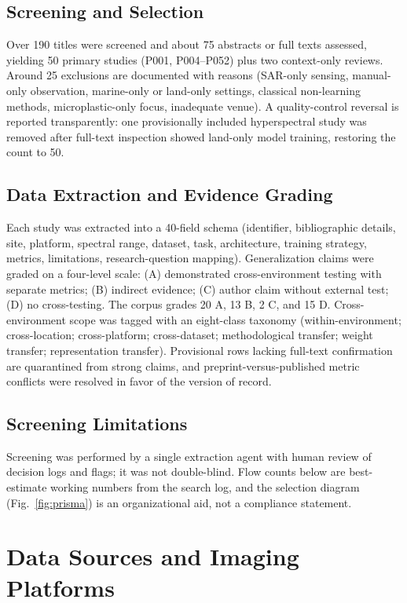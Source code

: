 \documentclass[12pt]{article}
\begin{document}
\subsection{Screening and Selection}
Over 190 titles were screened and about 75 abstracts or full texts assessed, yielding 50 primary studies (P001, P004--P052) plus two context-only reviews. Around 25 exclusions are documented with reasons (SAR-only sensing, manual-only observation, marine-only or land-only settings, classical non-learning methods, microplastic-only focus, inadequate venue). A quality-control reversal is reported transparently: one provisionally included hyperspectral study was removed after full-text inspection showed land-only model training, restoring the count to 50.

\subsection{Data Extraction and Evidence Grading}
Each study was extracted into a 40-field schema (identifier, bibliographic details, site, platform, spectral range, dataset, task, architecture, training strategy, metrics, limitations, research-question mapping). Generalization claims were graded on a four-level scale: (A) demonstrated cross-environment testing with separate metrics; (B) indirect evidence; (C) author claim without external test; (D) no cross-testing. The corpus grades 20 A, 13 B, 2 C, and 15 D. Cross-environment scope was tagged with an eight-class taxonomy (within-environment; cross-location; cross-platform; cross-dataset; methodological transfer; weight transfer; representation transfer). Provisional rows lacking full-text confirmation are quarantined from strong claims, and preprint-versus-published metric conflicts were resolved in favor of the version of record.

\subsection{Screening Limitations}
Screening was performed by a single extraction agent with human review of decision logs and flags; it was not double-blind. Flow counts below are best-estimate working numbers from the search log, and the selection diagram (Fig.~\ref{fig:prisma}) is an organizational aid, not a compliance statement.

\section{Data Sources and Imaging Platforms}
\label{sec:datasources}
\end{document}
